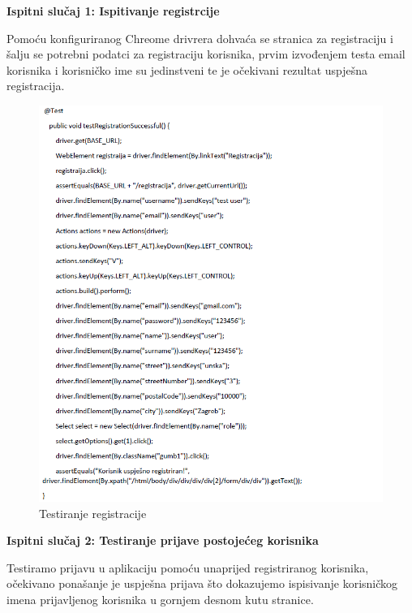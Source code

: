 			
			\textbf{Ispitni slučaj 1: Ispitivanje registrcije}
			
		Pomoću konfiguriranog Chreome drivrera dohvaća se stranica za registraciju i šalju se potrebni podatci za registraciju korisnika, prvim izvođenjem testa email korisnika i korisničko ime su jedinstveni te je očekivani rezultat uspješna registracija.
			
			
			
			\begin{figure}[H]
				\includegraphics[scale=0.9]{slike/sel1.PNG} %
				\centering
				\caption{Testiranje registracije}
				\label{fig:sel1}
			\end{figure}
			
			
			
			
			
			\textbf{Ispitni slučaj 2: Testiranje prijave postojećeg korisnika
				}
			
			Testiramo prijavu u aplikaciju pomoću unaprijed registriranog korisnika, očekivano ponašanje je uspješna prijava što dokazujemo ispisivanje korisničkog imena prijavljenog korisnika u gornjem desnom kutu stranice.
			
